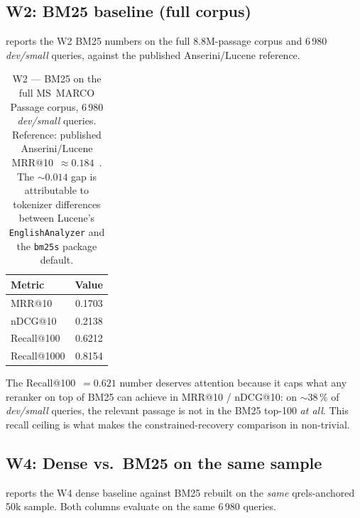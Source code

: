 \documentclass[11pt,a4paper]{article}
\makeatletter
\newcommand{\devsmall}{\textit{dev/small}}
\newcommand{\fdev}{6\,980}
\newcommand{\msmarco}{MS~MARCO}
\newcommand{\mrr}{MRR@10}
\newcommand{\ndcg}{nDCG@10}
\newcommand{\recallH}{Recall@100}
\newcommand{\recallK}{Recall@1000}
\newcommand{\bmtwofive}{BM25}
\makeatother
\begin{document}
\subsection{W2: \bmtwofive{} baseline (full corpus)}
\label{sec:w2-results}

 reports the W2 \bmtwofive{} numbers on the full
8.8M-passage corpus and \fdev{} \devsmall{} queries, against the
published Anserini/Lucene reference.

\begin{table}[H]
  \centering
  \caption{W2 --- \bmtwofive{} on the full \msmarco{} Passage corpus,
  \fdev{} \devsmall{} queries.  Reference: published Anserini/Lucene
  \mrr{}~$\approx 0.184$~\cite{lin2021pyserini}.  The $\sim\!0.014$
  gap is attributable to tokenizer differences between Lucene's
  \texttt{EnglishAnalyzer} and the \texttt{bm25s} package
  default.}
  \label{tab:w2-results}
  \begin{tabular}{lr}
    \toprule
    Metric        & Value \\
    \midrule
    \mrr{}        & 0.1703 \\
    \ndcg{}       & 0.2138 \\
    \recallH{}    & 0.6212 \\
    \recallK{}    & 0.8154 \\
    \bottomrule
  \end{tabular}
\end{table}

The \recallH{}~$=0.621$ number deserves attention because it caps
what any reranker on top of \bmtwofive{} can achieve in \mrr{} /
\ndcg{}: on $\sim\!38\,\%$ of \devsmall{} queries, the relevant
passage is not in the \bmtwofive{} top-100 \emph{at all}.  This
recall ceiling is what makes the constrained-recovery comparison in
 non-trivial.

\subsection{W4: Dense vs.\ \bmtwofive{} on the same sample}
\label{sec:w4-results}

 reports the W4 dense baseline against
\bmtwofive{} rebuilt on the \emph{same} qrels-anchored 50k sample.
Both columns evaluate on the same \fdev{} queries.
\end{document}
